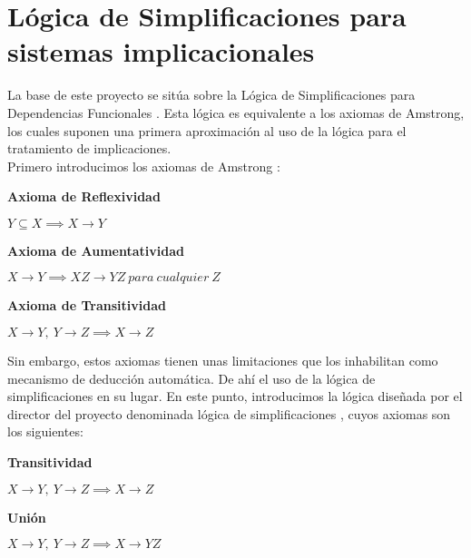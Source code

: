 \section{L\'ogica de Simplificaciones para sistemas implicacionales}


La base de este proyecto se sit\'ua sobre la L\'ogica de Simplificaciones para Dependencias Funcionales \cite{Cordero2002}. Esta l\'ogica es equivalente a los axiomas de Amstrong, los cuales suponen una primera aproximaci\'on al uso de la l\'ogica para el tratamiento de implicaciones.\\

Primero introducimos los axiomas de Amstrong \cite{Armstrong1974DependencySO}:

\textbf{Axioma de Reflexividad}

\begin{center}
    \(Y \subseteq X \implies X \to Y \)
\end{center}

\textbf{Axioma de Aumentatividad}

\begin{center}
    \(X \to Y \implies XZ \to YZ \ para \ cualquier \ Z \)
\end{center}

\textbf{Axioma de Transitividad}

\begin{center}
    \(X \to Y, \ Y \to Z \implies X \to Z \)
\end{center}

Sin embargo, estos axiomas tienen unas limitaciones que los inhabilitan como mecanismo de deducci\'on autom\'atica. De ah\'i el uso de la l\'ogica de simplificaciones en su lugar. En este punto, introducimos la l\'ogica dise\~nada por el director del proyecto denominada l\'ogica de simplificaciones \cite{Cordero2002}, cuyos axiomas son los siguientes:

\textbf{Transitividad}

\begin{center}
    \(X \to Y, \ Y \to Z \implies X \to Z \)
\end{center}

\textbf{Uni\'on}

\begin{center}
    \(X \to Y, \ Y \to Z \implies X \to YZ \)
\end{center}

